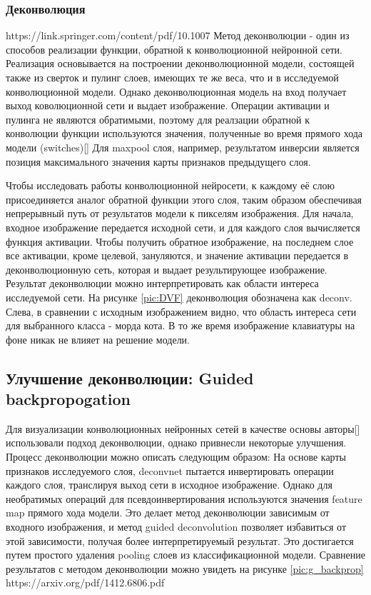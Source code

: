 \documentclass[oneside,final,14pt]{extreport}
\begin{document}
\subsubsection{Деконволюция}
https://link.springer.com/content/pdf/10.1007%
Метод деконволюции - один из способов реализации функции, обратной к конволюционной нейронной сети. 
Реализация основывается на построении деконволюционной модели, состоящей также из сверток и пулинг слоев, имеющих те же веса, что и в исследуемой конволюционной модели. Однако деконволюционная модель на вход получает выход коволюционной сети и выдает изображение. Операции активации и пулинга не являются обратимыми, поэтому для реалзации обратной к конволюции функции используются значения, полученные во время прямого хода модели (switches)[] Для maxpool слоя, например, результатом инверсии является позиция максимального значения карты признаков предыдущего слоя.  

Чтобы исследовать работы конволюционной нейросети,  к каждому её слою присоединяется аналог обратной функции этого слоя, таким образом обеспечивая непрерывный путь от результатов модели к пикселям изображения. Для начала, входное изображение передается исходной сети, и для каждого слоя вычисляется функция активации. Чтобы получить обратное изображение, на последнем слое все активации, кроме целевой, зануляются, и значение активации передается в деконволюционную сеть, которая и выдает результирующее изображение. Результат деконволюции можно интерпретировать как области интереса исследуемой сети. На рисунке \ref{pic:DVF} деконволюция обозначена как deconv. Слева, в сравнении с исходным изображением видно, что область интереса сети для выбранного класса - морда кота. В то же время изображение клавиатуры на фоне никак не влияет на решение модели. 
\subsection{Улучшение деконволюции: Guided backpropogation}
Для визуализации конволюционных нейронных сетей в качестве основы авторы[] использовали подход деконволюции, однако привнесли некоторые улучшения.    
Процесс деконволюции можно описать следующим образом: На основе карты признаков исследуемого слоя, deconvnet пытается инвертировать операции каждого слоя, транслируя выход сети в исходное изображение. Однако для необратимых операций для псевдоинвертирования используются значения feature map прямого хода модели. Это делает метод деконволюции зависимым от входного изображения, и метод guided deconvolution позволяет избавиться от этой зависимости, получая более интерпретируемый результат. Это достигается путем простого удаления pooling слоев из классификационной модели.  Сравнение результатов с методом деконволюции можно увидеть на рисунке \ref{pic:g_backprop}
https://arxiv.org/pdf/1412.6806.pdf
\end{document}
